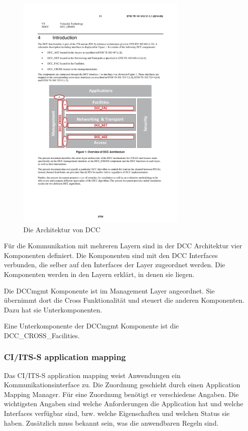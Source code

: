 \begin{figure}
	\includegraphics[width=0.75\textwidth]{content/images/02_architektur/dccArchitektur.pdf}
	\caption{Die Architektur von DCC \cite{etsi102687}}
	\label{fig:architektur_dccArchitektur}
\end{figure}

Für die Kommunikation mit mehreren Layern sind in der  \ac{DCC} Architektur vier Komponenten definiert. Die Komponenten sind mit den \ac{DCC} Interfaces verbunden, die selber auf den Interfaces der Layer zugeordnet werden. Die Komponenten werden in den Layern erklärt, in denen sie liegen. 

Die DCCmgmt Komponente ist im Management Layer angeordnet. Sie übernimmt dort die Cross Funktionalität und steuert die anderen Komponenten. Dazu hat sie Unterkomponenten.

Eine Unterkomponente der DCCmgmt Komponente ist die DCC\_CROSS\_Facilities. 



\subsubsection{CI/ITS-S application mapping}
Das CI/ITS-S application mapping weist Anwendungen ein Kommunikationsinterface zu. Die Zuordnung geschieht durch einen Application Mapping Manager. Für eine  Zuordnung benötigt er verschiedene Angaben. Die wichtigsten Angaben sind welche Anforderungen die Application hat und welche Interfaces ver\-füg\-bar sind, bzw. welche Eigenschaften und welchen Status sie haben. Zusätzlich muss bekannt sein, was die anwendbaren Regeln sind. 



